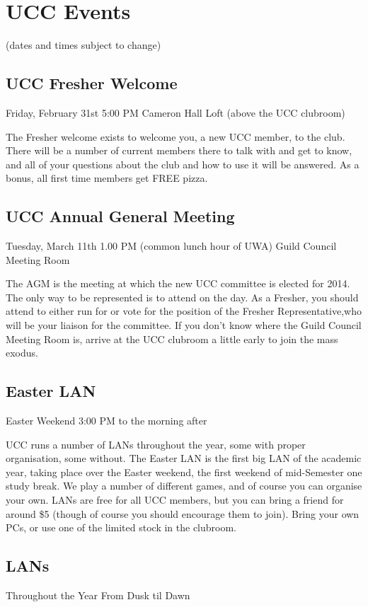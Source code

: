 \chapter{UCC Events}
(dates and times subject to change)


\section{UCC Fresher Welcome}
Friday, February 31st
5:00 PM
Cameron Hall Loft (above the UCC clubroom)

The Fresher welcome exists to welcome you, a new UCC member, to the club. There will be a number of current members there to talk with and get to know, and all of your questions about the club and how to use it will be answered. As a bonus, all first time members get FREE pizza.

\section{UCC Annual General Meeting}
Tuesday, March 11th
1.00 PM (common lunch hour of UWA)
Guild Council Meeting Room

The AGM is the meeting at which the new UCC committee is elected for 2014. The only way to be represented is to attend on the day. As a Fresher, you should attend to either run for or vote for the position of the Fresher Representative,who will be your liaison for the committee. If you don't know where the Guild Council Meeting Room is, arrive at the UCC clubroom a little early to join the mass exodus.

\section{Easter LAN}
Easter Weekend
3:00 PM to the morning after

UCC runs a number of LANs throughout the year, some with proper organisation, some without. The Easter LAN is the first big LAN of the academic year, taking place over the Easter weekend, the first weekend of mid-Semester one study break. We play a number of different games, and of course you can organise your own. LANs are free for all UCC members, but you can bring a friend for around \$5 (though of course you should encourage them to join). Bring your own PCs, or use one of the limited stock in the clubroom.

\section{LANs}
Throughout the Year
From Dusk til Dawn

